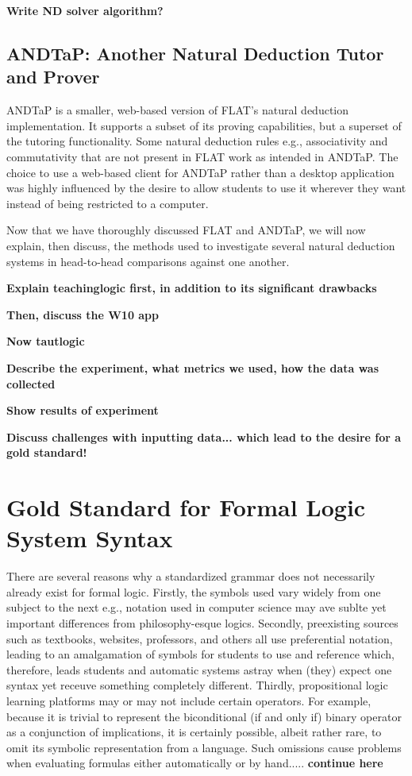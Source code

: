 \documentclass[ms]{uncgdissertationexp2}
\theoremstyle{plain}
\theoremstyle{definition}
\theoremstyle{remark}
\begin{document}
    \textbf{Write ND solver algorithm?}

    \subsection{ANDTaP: Another Natural Deduction Tutor and Prover}
    ANDTaP is a smaller, web-based version of FLAT's natural deduction implementation. It supports a subset of its proving capabilities, but a superset of the tutoring functionality. Some natural deduction rules e.g., associativity and commutativity that are not present in FLAT work as intended in ANDTaP. The choice to use a web-based client for ANDTaP rather than a desktop application was highly influenced by the desire to allow students to use it wherever they want instead of being restricted to a computer.

    Now that we have thoroughly discussed FLAT and ANDTaP, we will now explain, then discuss, the methods used to investigate several natural deduction systems in head-to-head comparisons against one another.

    \textbf{Explain teachinglogic first, in addition to its significant drawbacks}

    \textbf{Then, discuss the W10 app}

    \textbf{Now tautlogic}

    \textbf{Describe the experiment, what metrics we used, how the data was collected}

    \textbf{Show results of experiment}

    \textbf{Discuss challenges with inputting data... which lead to the desire for a gold standard!}
    
    \section{Gold Standard for Formal Logic System Syntax}
    There are several reasons why a standardized grammar does not necessarily already exist for formal logic. Firstly, the symbols used vary widely from one subject to the next e.g., notation used in computer science may ave sublte yet important differences from philosophy-esque logics. Secondly, preexisting sources such as textbooks, websites, professors, and others all use preferential notation, leading to an amalgamation of symbols for students to use and reference which, therefore, leads students and automatic systems astray when (they) expect one syntax yet receuve something completely different. Thirdly, propositional logic learning platforms may or may not include certain operators. For example, because it is trivial to represent the biconditional (if and only if) binary operator as a conjunction of implications, it is certainly possible, albeit rather rare, to omit its symbolic representation from a language. Such omissions cause problems when evaluating formulas either automatically or by hand..... \textbf{continue here}
\end{document}
